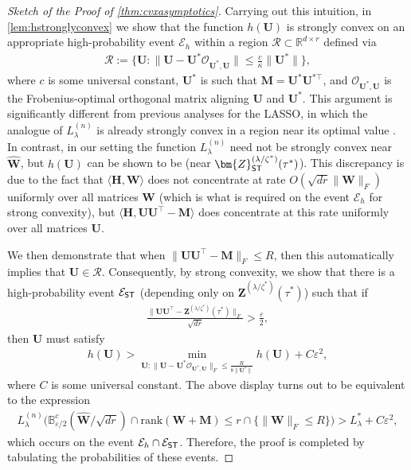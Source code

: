 \documentclass[10pt]{article}
\newcommand{\eps}{\ensuremath{\varepsilon}}
\newcommand{\s}{^*}
\renewcommand{\t}{^{\top}}
\renewcommand{\hat}{\widehat}
\theoremstyle{definition}
\begin{document}
\begin{proof}[Sketch of the Proof of \cref{thm:cvxasymptotics}]
Carrying out this intuition, in \cref{lem:hstronglyconvex} we show that the function $h(\bm{U})$ is strongly convex on an appropriate high-probability event $\mathcal{E}_h$ within a region $\mathcal{R} \subset \mathbb{R}^{d \times r}$ defined via
\begin{align}
    \mathcal{R} := \bigg\{ \bm{U}: \| \bm{U} - \bm{U}\s \mathcal{O}_{\bm{U}\s,\bm{U}} \| \leq \frac{c}{\kappa} \| \bm{U}\s \| \bigg\},
\end{align}
where $c$ is some universal constant, $\bm{U}\s$ is such that $\bm{M}  = \bm{U}\s \bm{U}^{*\top}$, and $\mathcal{O}_{\bm{U}\s,\bm{U}} $ is the Frobenius-optimal orthogonal matrix aligning $\bm{U}$ and $\bm{U}\s$.  This argument is significantly different from previous analyses for the LASSO, in which the analogue of $L_{\lambda}^{(n)}$ is already strongly convex in a region near its optimal value \citep{miolane_distribution_2021}.  In contrast, in our setting the function $L_{\lambda}^{(n)}$ need not be strongly convex near $\bm{\hat W}$, but $h(\bm{U})$ can be shown to be (near $\bm{Z}_{{\sf ST}}^{(\lambda/\zeta\s)}(\tau\s)$).  This discrepancy is due to the fact that $\langle \bm{H},\bm{W} \rangle$ does not concentrate at rate $O(\sqrt{dr} \|\bm{W}\|_F)$ uniformly over all matrices $\bm{W}$ (which is what is required on the event $\mathcal{E}_h$ for strong convexity), but $\langle \bm{H}, \bm{UU}\t - \bm{M} \rangle$ does concentrate at this rate uniformly over all matrices $\bm{U}$.  


We then demonstrate that when $\|\bm{UU}\t - \bm{M} \|_F \leq R$, then this automatically implies that $\bm{U} \in \mathcal{R}$. Consequently, by strong convexity, we show that there is a high-probability event $\mathcal{E}_{{\sf ST}}$ (depending only on $\bm{Z}^{(\lambda/\zeta\s)}(\tau\s)$) such that if
\begin{align}
    \frac{\|\bm{UU}\t - \bm{Z}^{(\lambda/\zeta\s)}(\tau\s)\|_F}{\sqrt{dr}} > \frac{\eps}{2},
\end{align}
then $\bm{U}$ must satisfy 
\begin{align}
    h(\bm{U}) > \min_{\bm{U}: \|\bm{U}- \bm{U}\s \mathcal{O}_{\bm{U}\s,\bm{U}} \|_F \leq \frac{R}{8 \|\bm{U}\s\|}} h(\bm{U}) + C\eps^2,
\end{align}
where $C$ is some universal constant.   The above display turns out to be equivalent to the expression
\begin{align}
    L_{\lambda}^{(n)}\bigg( \mathbb{B}_{\eps/2}^c(\bm{\hat W}/\sqrt{dr}) \cap \mathrm{rank}(\bm{W} + \bm{M}) \leq r \cap \{ \|\bm{W}\|_F \leq R \} \bigg) > L_{\lambda}^* + C \eps^2,
\end{align}
which occurs on the event $\mathcal{E}_h \cap \mathcal{E}_{{\sf ST}}$.  Therefore, the proof is completed by tabulating the probabilities of these events.  
\end{proof}
\end{document}
